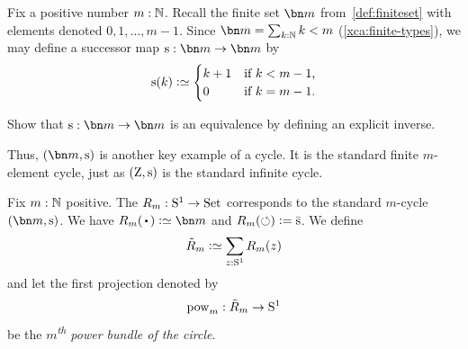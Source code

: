 Fix a positive number $m:\mathbb{N}$. Recall the finite set $\bn m$ from~\cref{def:finiteset} with elements denoted $0,1,\dots,m-1$.
Since $\bn m = \sum_{k:\NN}k<m$ (\cref{xca:finite-types}),
we may define a successor map $\zs : \bn m \to \bn m$ by
\[
  \zs(k) \defeq
  \begin{cases}
    k+1 & \text{if $k<m-1$,} \\
    0   & \text{if $k=m-1$.}
  \end{cases}
\]
\begin{exercise}
  Show that $\zs : \bn m \to \bn m$ is an equivalence by defining
  an explicit inverse.
\end{exercise}
Thus, $(\bn m,\zs)$ is another key example of a cycle.
It is the standard finite $m$-element cycle,
just as $(\zet,\zs)$ is the standard infinite cycle.
\begin{definition}\label{def:RmtoS1}
  Fix $m:\mathbb{N}$ positive.
  The \covering $R_m : {\mathrm{S}^1}\to\mathrm{Set}$ corresponds to the standard $m$-cycle
  $(\bn m,\zs)$. We have $R_m(\base) \defeq \bn m$ and
  $R_m(\Sloop) \defis \etop\zs$. We define
  \[
    \tilde R_m \defeq \sum_{z:\Sc} R_m(z)
  \]
  and let the first projection denoted by
  \[
    \pow{m} : \tilde R_m \to \Sc
  \]
  be the \emph{$m$\textsuperscript{th} power bundle of the circle}.
\end{definition}
